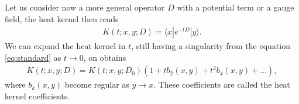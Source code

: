 Let us consider now a more general operator $D$ with a potential term or a
gauge field, the heat kernel then reads
\begin{align}
    K(t;x,y;D) = \langle x|e^{-tD}|y\rangle.
\end{align}
We can expand the heat kernel in $t$, still having a
singularity from the equation \eqref{eq:standard} as $t \rightarrow 0$, on
obtains
\begin{align}
    K(t;x,y;D) = K(t;x,y;D_0)\left(1 + tb_2(x,y) + t^2b_4(x,y) + \dots
    \right),
\end{align}
where $b_k(x,y)$ become regular as $y \rightarrow x$. These coefficients are called the heat
kernel coefficients.
